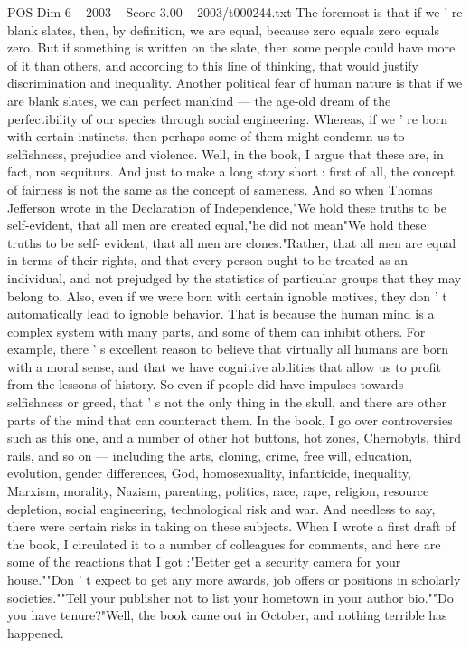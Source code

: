 \begin{textsample}{POS Dim 6 – 2003 – Score 3.00 – 2003/t000244.txt}
The foremost is that if we ' re blank slates, then, by definition, we are equal, because zero equals zero equals zero.
But if something is written on the slate, then some people could have more of it than others, and according to this line of thinking, that would justify discrimination and inequality.
Another political fear of human nature is that if we are blank slates, we can perfect mankind — the age-old dream of the perfectibility of our species through social engineering.
Whereas, if we ' re born with certain instincts, then perhaps some of them might condemn us to selfishness, prejudice and violence.
Well, in the book, I argue that these are, in fact, non sequiturs.
And just to make a long story short : first of all, the concept of fairness is not the same as the concept of sameness.
And so when Thomas Jefferson wrote in the Declaration of Independence,"We hold these truths to be self-evident, that all men are created equal,"he did not mean"We hold these truths to be self- evident, that all men are clones."Rather, that all men are equal in terms of their rights, and that every person ought to be treated as an individual, and not prejudged by the statistics of particular groups that they may belong to.
Also, even if we were born with certain ignoble motives, they don ' t automatically lead to ignoble behavior.
That is because the human mind is a complex system with many parts, and some of them can inhibit others.
For example, there ' s excellent reason to believe that virtually all humans are born with a moral sense, and that we have cognitive abilities that allow us to profit from the lessons of history.
So even if people did have impulses towards selfishness or greed, that ' s not the only thing in the skull, and there are other parts of the mind that can counteract them.
In the book, I go over controversies such as this one, and a number of other hot buttons, hot zones, Chernobyls, third rails, and so on — including the arts, cloning, crime, free will, education, evolution, gender differences, God, homosexuality, infanticide, inequality, Marxism, morality, Nazism, parenting, politics, race, rape, religion, resource depletion, social engineering, technological risk and war.
And needless to say, there were certain risks in taking on these subjects.
When I wrote a first draft of the book, I circulated it to a number of colleagues for comments, and here are some of the reactions that I got :"Better get a security camera for your house.""Don ' t expect to get any more awards, job offers or positions in scholarly societies.""Tell your publisher not to list your hometown in your author bio.""Do you have tenure?"Well, the book came out in October, and nothing terrible has happened.

\end{textsample}
